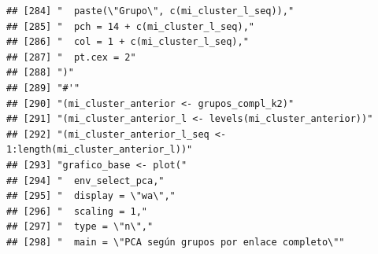 \documentclass[11pt,]{article}
\begin{document}
\begin{verbatim}
## [284] "  paste(\"Grupo\", c(mi_cluster_l_seq)),"                                                                                                                              
## [285] "  pch = 14 + c(mi_cluster_l_seq),"                                                                                                                                     
## [286] "  col = 1 + c(mi_cluster_l_seq),"                                                                                                                                      
## [287] "  pt.cex = 2"                                                                                                                                                          
## [288] ")"                                                                                                                                                                     
## [289] "#'"                                                                                                                                                                    
## [290] "(mi_cluster_anterior <- grupos_compl_k2)"                                                                                                                              
## [291] "(mi_cluster_anterior_l <- levels(mi_cluster_anterior))"                                                                                                                
## [292] "(mi_cluster_anterior_l_seq <- 1:length(mi_cluster_anterior_l))"                                                                                                        
## [293] "grafico_base <- plot("                                                                                                                                                 
## [294] "  env_select_pca,"                                                                                                                                                     
## [295] "  display = \"wa\","                                                                                                                                                   
## [296] "  scaling = 1,"                                                                                                                                                        
## [297] "  type = \"n\","                                                                                                                                                       
## [298] "  main = \"PCA según grupos por enlace completo\""                                                                                                                     

\end{verbatim}
\end{document}
